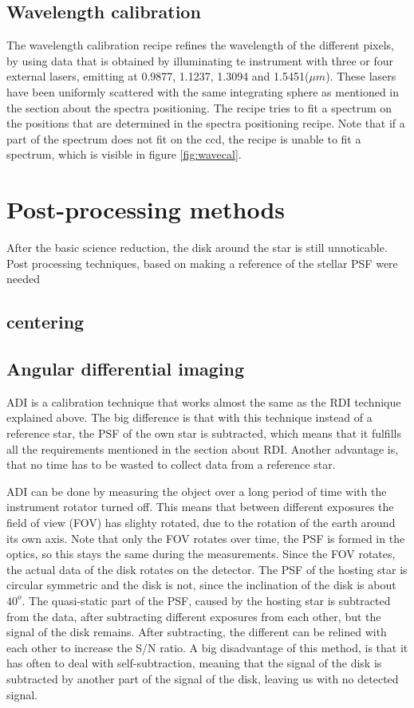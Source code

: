 \documentclass[twoside,single]{lion-msc}
\begin{document}
\subsection{Wavelength calibration}
The wavelength calibration recipe refines the wavelength of the different pixels, by using data that is obtained by illuminating te instrument with three or four external lasers, emitting at 0.9877, 1.1237, 1.3094 and 1.5451($\mu m$). These lasers have been uniformly scattered with the same integrating sphere as mentioned in the section about the spectra positioning. The recipe tries to fit a spectrum on the positions that are determined in the spectra positioning recipe. Note that if a part of the spectrum does not fit on the ccd, the recipe is unable to fit a spectrum, which is visible in figure \ref{fig:wavecal}. 

\section{Post-processing methods}
After the basic science reduction, the disk around the star is still unnoticable. Post processing techniques, based on making a reference of the stellar PSF were needed 

\subsection{centering}

\subsection{Angular differential imaging}
ADI is a calibration technique that works almost the same as the RDI technique explained above. The big difference is that with this technique instead of a reference star, the PSF of the own star is subtracted, which means that it fulfills all the requirements mentioned in the section about RDI. Another advantage is, that no time has to be wasted to collect data from a reference star. 
\bigskip

ADI can be done by measuring the object over a long period of time with the instrument rotator turned off. This means that between different exposures the field of view (FOV) has slighty rotated, due to the rotation of the earth around its own axis. Note that only the FOV rotates over time, the PSF is formed in the optics, so this stays the same during the measurements. Since the FOV rotates, the actual data of the disk rotates on the detector. The PSF of the hosting star is circular symmetric and the disk is not, since the inclination of the disk is about $40^o$. The quasi-static part of the PSF, caused by the hosting star is subtracted from the data, after subtracting different exposures from each other, but the signal of the disk remains. After subtracting, the different can be relined with each other to increase the S/N ratio. A big disadvantage of this method, is that it has often to deal with self-subtraction, meaning that the signal of the disk is subtracted by another part of the signal of the disk, leaving us with no detected signal. \cite{Marois2005} 
\end{document}
